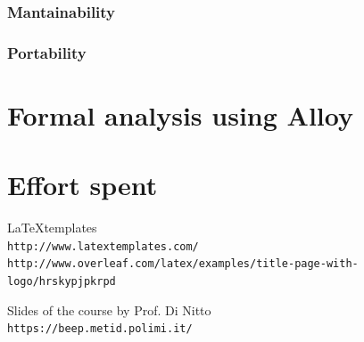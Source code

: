 \documentclass[12pt]{article}
\begin{document}
    \subsubsection{Mantainability}
    \subsubsection{Portability}

\clearpage
\section{Formal analysis using Alloy}
\label{sec:alloy}

\clearpage
\section{Effort spent}
\label{sec:effort}


\clearpage
\begin{thebibliography}{9}

  \LaTeX templates
  \\\texttt{http://www.latextemplates.com/}
  \\\texttt
  {http://www.overleaf.com/latex/examples/title-page-with-logo/hrskypjpkrpd}

  Slides of the course by Prof. Di Nitto
  \\\texttt{https://beep.metid.polimi.it/}





\end{thebibliography}
\end{document}
